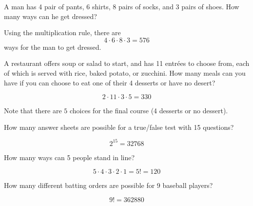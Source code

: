 \documentclass[11pt]{exam}
\begin{document}
\begin{questions}
\question A man has 4 pair of pants, 6 shirts, 8 pairs of socks, and 3 pairs of
shoes.  How many ways can he get dressed?

\begin{solution}
Using the multiplication rule, there are
\[
  4 \cdot 6 \cdot 8 \cdot 3 = 576
\]
ways for the man to get dressed.
\end{solution}



\question A restaurant offers soup or salad to start, and has 11 entr\'ees to choose
from, each of which is served with rice, baked potato, or zucchini.   How many
meals can you have if you can choose to eat one of their 4 desserts or have no
desert?

\begin{solution}
\[
  2 \cdot 11 \cdot 3 \cdot 5 = 330
\]

Note that there are $5$ choices for the final course (4 desserts or no
dessert).

\end{solution}



\question How many answer sheets are possible for a true/false test with 15
questions?

\begin{solution}
\[
  2^{15} = 32768
\]
\end{solution}






\question How many ways can 5 people stand in line?

\begin{solution}
\[
  5 \cdot 4 \cdot 3 \cdot 2 \cdot 1 = 5! = 120
\]
\end{solution}



\question How many different batting orders are possible for 9 baseball players?

\begin{solution}
\[
  9! = 362880
\]
\end{solution}


\end{questions}
\end{document}
